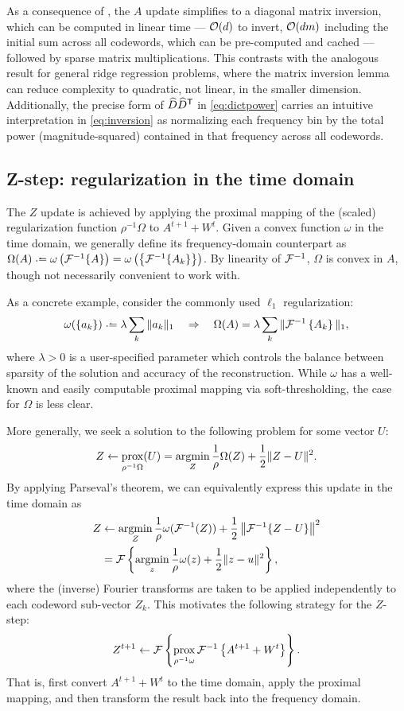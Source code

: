 \documentclass{article} %
\begin{document}
As a consequence of , the $A$ update simplifies to a diagonal matrix
inversion, which can be computed in linear time --- $\mathcal{O}(d)$ to invert, $\mathcal{O}(dm)$
including the initial sum across all codewords, which can be pre-computed and 
cached --- followed by sparse matrix multiplications.
This contrasts with the analogous result for general ridge regression problems, where the 
matrix inversion lemma can reduce complexity to quadratic, not linear, in the smaller 
dimension. 
Additionally, the precise form of $\widehat{D}\widehat{D}^\mathsf{T}$ in \eqref{eq:dictpower} 
carries an intuitive interpretation in \eqref{eq:inversion} as normalizing each frequency 
bin by the total power (magnitude-squared) contained in that frequency across all 
codewords.


\subsection{Z-step: regularization in the time domain}
\label{sec:zstep}
The $Z$ update is achieved by applying the proximal mapping of the (scaled) 
regularization function $\rho^{-1}\Omega$ to $A^{t+1} + W^t$.  
Given a convex function $\omega$ in the time domain, we generally define its
frequency-domain counterpart as 
$\Omega(A) \defeq \omega\left(\F^{-1}\{A\}\right) = \omega\left(\left\{\F^{-1}\{A_k\}\right\}\right)$.  By linearity of
$\mathcal{F}^{-1}$, $\Omega$ is convex in $A$, though not necessarily convenient to work with.

As a concrete example, consider the commonly used $\ell_1$ regularization:
\[
\omega(\{a_k\}) \defeq \lambda \sum_k \|a_k\|_1
\quad \Rightarrow \quad
\Omega(A) = \lambda \sum_k \| \F^{-1} \left\{ A_k \right\} \|_1,
\]
where $\lambda>0$ is a user-specified parameter which controls the balance between
sparsity of the solution and accuracy of the reconstruction.  While $\omega$ has a
well-known and easily computable proximal mapping via soft-thresholding, the case 
for $\Omega$ is less clear.

More generally, we seek a solution to the following problem for some vector $U$:
\[
Z \leftarrow \operatorname*{prox}_{\rho^{-1}\Omega}(U) = \operatorname*{argmin}_Z \frac{1}{\rho}\Omega(Z) + \frac{1}{2} \| Z - U\|^2.
\]
By applying Parseval's theorem, we can equivalently express this update in the time
domain as
\begin{align*}
Z &\leftarrow \operatorname*{argmin}_Z \frac{1}{\rho} \omega(\mathcal{F}^{-1}(Z)) +
\frac{1}{2}\left\|\mathcal{F}^{-1}\{Z - U\}\right\|^2\notag\\
&= \mathcal{F}\left\{\operatorname*{argmin}_z \frac{1}{\rho} \omega(z) + \frac{1}{2} \|z - u\|^2
\right\},\label{eq:time-regularize}
\end{align*}
where the (inverse) Fourier transforms are taken to be applied independently to 
each codeword sub-vector $Z_k$.  
This motivates the following strategy for the $Z$-step:
\begin{equation}
Z^{t+1} \leftarrow \mathcal{F}\left\{ \operatorname*{prox}_{\rho^{-1}\omega} \mathcal{F}^{-1}\left\{A^{t+1} + W^t
\right\} \right\}.\label{eq:timeprox}
\end{equation}
That is, first convert $A^{t+1} + W^t$ to the time domain, apply the
proximal mapping, and then transform the result back into the frequency domain.
\end{document}
